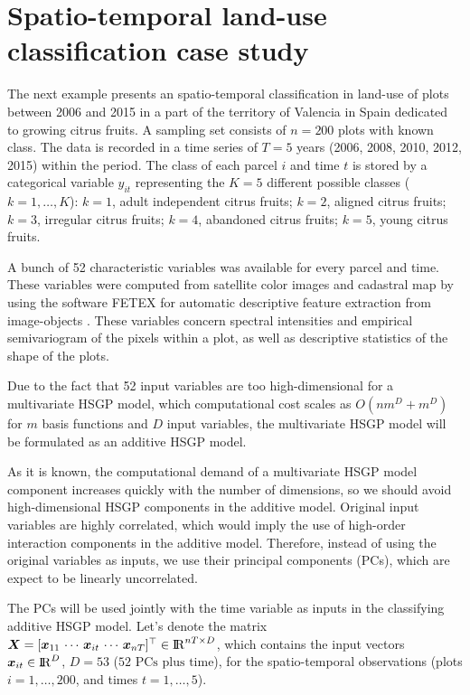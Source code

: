 \documentclass[onecolumn,a4paper,11pt]{article}
\begin{document}
\section{Spatio-temporal land-use classification case study}\label{ch5_sec_application_caseII}


The next example presents an spatio-temporal classification in land-use of plots between 2006 and 2015 in a part of the territory of Valencia in Spain dedicated to growing citrus fruits. A sampling set consists of $n=200$ plots with known class. The data is recorded in a time series of $T=5$ years (2006, 2008, 2010, 2012, 2015) within the period. The class of each parcel $i$ and time $t$ is stored by a categorical variable $y_{it}$ representing the $K=5$ different possible classes ($k=1,\dots,K$): $k=1$, adult independent citrus fruits; $k=2$, aligned citrus fruits; $k=3$, irregular citrus fruits; $k=4$, abandoned citrus fruits; $k=5$, young citrus fruits. 

A bunch of 52 characteristic variables was available for every parcel and time. These variables were computed from satellite color images and cadastral map by using the software FETEX for automatic descriptive feature extraction from image-objects \citep{ruiz2011feature}. These variables concern spectral intensities and empirical semivariogram of the pixels within a plot, as well as descriptive statistics of the shape of the plots.

Due to the fact that 52 input variables are too high-dimensional for a multivariate HSGP model, which computational cost scales as $O(n m^D+m^D)$ for $m$ basis functions and $D$ input variables, the multivariate HSGP model will be formulated as an additive HSGP model. 

As it is known, the computational demand of a multivariate HSGP model component increases quickly with the number of dimensions, so we should avoid high-dimensional HSGP components in the additive model. Original input variables are highly correlated, which would imply the use of high-order interaction components in the additive model. Therefore, instead of using the original variables as inputs, we use their principal components (PCs), which are expect to be linearly uncorrelated. %

The PCs will be used jointly with the time variable as inputs in the classifying additive HSGP model. Let's denote the matrix $\bm{X}=[\bm{x}_{11}\, \cdots \, \bm{x}_{it} \, \cdots \, \bm{x}_{nT}]^\top \in {\rm I\!R}^{nT\times D}$, which contains the input vectors $\bm{x}_{it} \in {\rm I\!R}^D$, $D=53$ ($52 \text{ PCs plus time}$), for the spatio-temporal observations (plots $i=1,\dots,200$, and times $t=1,\dots,5$). 
\end{document}
